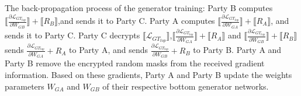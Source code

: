 \documentclass[final,1p,times]{elsarticle}
\begin{document}
The back-propagation process of the generator training: Party B computes $\llbracket\frac{\partial\mathcal{L}_{GT_{top}}}{\partial{W}_{GB}}\rrbracket+\llbracket{R}_{B}\rrbracket$,and sends it to Party C. Party A computes $\llbracket\frac{\partial\mathcal{L}_{GT_{top}}}{\partial\mathcal{W}_{GA}}\rrbracket+\llbracket{R}_{A}\rrbracket$, and sends it to Party C. Party C decrypts $\llbracket\mathcal{L}_{GT_{top}}\rrbracket$,$\llbracket\frac{\partial\mathcal{L}_{GT_{top}}}{\partial{W}_{GA}}\rrbracket+\llbracket{R}_{A}\rrbracket$ and $\llbracket\frac{\partial\mathcal{L}_{GT_{top}}}{\partial{W}_{GB}}\rrbracket+\llbracket{R}_{B}\rrbracket$ sends $\frac{\partial\mathcal{L}_{GT_{top}}}{\partial W_{GA}}+R_{A}$
to Party A, and sends  $\frac{\partial\mathcal{L}_{GT_{top}}}{\partial W_{GB}}+R_{B}$ to Party B. Party A and Party B remove the encrypted random masks from the received gradient information. Based on these gradients, Party A and Party B update the weights parameters $W_{GA}$ and $W_{GB}$ of their respective bottom generator networks.
\end{document}
